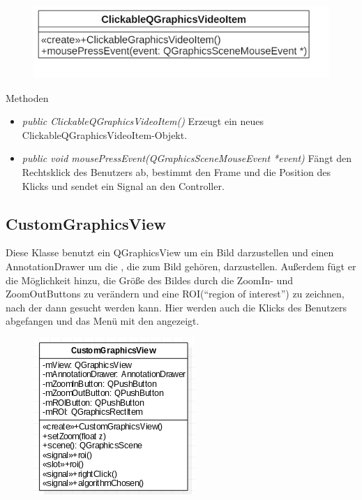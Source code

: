 \begin{figure}[H]
	\centering
	\includegraphics[scale=0.5]{img/Klassendiagramm/Klassen/View/ClickableQGraphicsVideoItem}
	\label{fig:clickableQGraphicsVideoItem}
\end{figure}

Methoden
\begin{itemize}
	\item\textit{public ClickableQGraphicsVideoItem()} 
	Erzeugt ein neues ClickableQGraphicsVideoItem-Objekt.
	\item\textit{public void mousePressEvent(QGraphicsSceneMouseEvent *event)} 
	Fängt den Rechtsklick des Benutzers ab, bestimmt den Frame und die Position des Klicks und sendet ein Signal an den Controller.
\end{itemize}

\subsection*{CustomGraphicsView}
Diese Klasse benutzt ein QGraphicsView um ein Bild darzustellen und einen AnnotationDrawer um die , die zum Bild gehören, darzustellen. Außerdem fügt er die Möglichkeit hinzu, die Größe des Bildes durch die ZoomIn- und ZoomOutButtons zu verändern und eine \gls{ROI}(\enquote{region of interest}) zu zeichnen, nach der dann gesucht werden kann. Hier werden auch die Klicks des Benutzers abgefangen und das Menü mit den  angezeigt.

\begin{figure}[H]
	\centering
	\includegraphics[scale=0.5]{img/Klassendiagramm/Klassen/View/CustomGraphicsView}
	\label{fig:customGraphicsView}
\end{figure}

